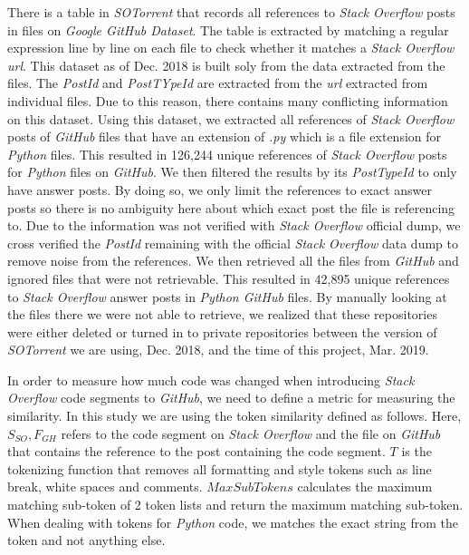 \documentclass[sigconf]{acmart}
\begin{document}
There is a table in \textit{SOTorrent} that records all references to \textit{Stack Overflow} posts in files on \textit{Google GitHub Dataset}.  The table is extracted by matching a regular expression line by line on each file to check whether it matches a \textit{Stack Overflow} \textit{url}. This dataset as of Dec. 2018 is built soly from the data extracted from the files. The \textit{PostId} and \textit{PostTYpeId} are extracted from the \textit{url} extracted from individual files. Due to this reason, there contains many conflicting information on this dataset. Using this dataset, we extracted all references of \textit{Stack Overflow} posts of \textit{GitHub} files that have an extension of \textit{.py} which is a file extension for \textit{Python} files. This resulted in 126,244 unique references of \textit{Stack Overflow} posts for \textit{Python} files on \textit{GitHub}. We then filtered the results by its \textit{PostTypeId} to only have answer posts. By doing so, we only limit the references to exact answer posts so there is no ambiguity here about which exact post the file is referencing to. Due to the information was not verified with \textit{Stack Overflow} official dump, we cross verified the \textit{PostId} remaining with the official \textit{Stack Overflow} data dump to remove noise from the references. We then retrieved all the files from \textit{GitHub} and ignored files that were not retrievable. This resulted in 42,895 unique references to \textit{Stack Overflow} answer posts in \textit{Python GitHub} files. By manually looking at the files there we were not able to retrieve, we realized that these repositories were either deleted or turned in to private repositories between the version of \textit{SOTorrent} we are using, Dec. 2018, and the time of this project, Mar. 2019. 

In order to measure how much code was changed when introducing \textit{Stack Overflow} code segments to \textit{GitHub}, we need to define a metric for measuring the similarity. In this study we are using the token similarity defined as follows. Here, $S_{SO}, F_{GH}$ refers to the code segment on \textit{Stack Overflow} and the file on \textit{GitHub} that contains the reference to the post containing the code segment. $T$ is the tokenizing function that removes all formatting and style tokens such as line break, white spaces and comments. $MaxSubTokens$ calculates the maximum matching sub-token of 2 token lists and return the maximum matching sub-token. When dealing with tokens for \textit{Python} code, we matches the exact string from the token and not anything else.
\end{document}
